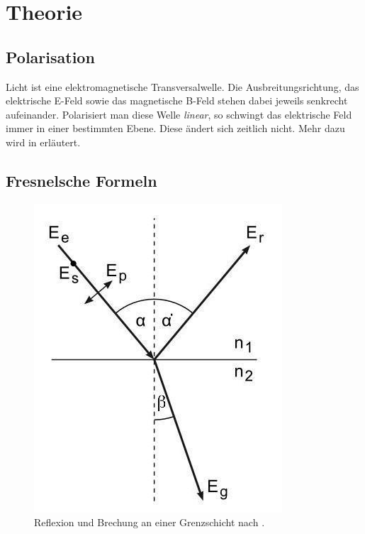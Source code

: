 \documentclass[12pt,a4paper,titlepage,headinclude,bibtotoc]{scrartcl}
\begin{document}
\section{Theorie}
\label{sec:theorie}
\subsection{Polarisation}
Licht ist eine elektromagnetische Transversalwelle.
Die Ausbreitungsrichtung, das elektrische E-Feld sowie das magnetische B-Feld stehen dabei jeweils senkrecht aufeinander.
Polarisiert man diese Welle \emph{linear}, so schwingt das elektrische Feld immer in einer bestimmten Ebene.
Diese ändert sich zeitlich nicht.
Mehr dazu wird in \cite[S.233ff.]{saleh-teich} erläutert.

\subsection{Fresnelsche Formeln}
\begin{figure}[!h]
	\centering	
	\includegraphics[scale=0.35]{Reflexion_Brechung.jpg}
	\caption{Reflexion und Brechung an einer Grenzschicht nach \cite[Datum: 23.03.2015]{LP20}.}	
	\label{fig:Reflexion_Brechung}
\end{figure}
\end{document}
